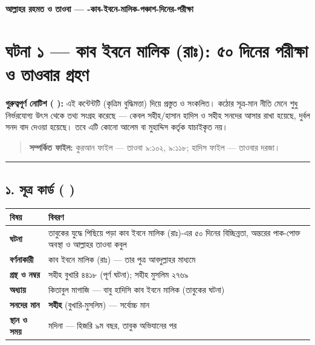 

\begin{center}{\Large\bfseries\color{emerald} আল্লাহর রহমত ও তাওবা — -কাব-ইবনে-মালিক-পঞ্চাশ-দিনের-পরীক্ষা}\end{center}
\vspace{1em}
\section*{ঘটনা ১ — কাব ইবনে মালিক (রাঃ): ৫০ দিনের পরীক্ষা ও তাওবার গ্রহণ}

\begin{warnbox}
 \textbf{গুরুত্বপূর্ণ নোটিশ ( ):} এই কন্টেন্টটি  (কৃত্রিম বুদ্ধিমত্তা) দিয়ে প্রস্তুত ও সংকলিত।  কঠোর সূত্র-মান নীতি মেনে শুধু নির্ভরযোগ্য উৎস থেকে তথ্য সংগ্রহ করেছে — কেবল সহীহ/হাসান হাদিস ও সহীহ সনদের আসার রাখা হয়েছে, দুর্বল সনদ বাদ দেওয়া হয়েছে। তবে এটি কোনো আলেম বা মুহাদ্দিস কর্তৃক যাচাইকৃত নয়।
\end{warnbox}

\begin{quote}
\textbf{সম্পর্কিত ফাইল:} কুরআন ফাইল — তাওবা ৯:১০২, ৯:১১৮; হাদিস ফাইল — তাওবার দরজা।
\end{quote}

\medskip\hrule\medskip

\subsection*{১. সূত্র কার্ড ( )}

\begin{table}[h]\centering\small
\begin{tabular}{ll}
বিষয় & বিবরণ \\
\hline
\textbf{ঘটনা} & তাবুকের যুদ্ধে পিছিয়ে পড়া কাব ইবনে মালিক (রাঃ)-এর ৫০ দিনের বিচ্ছিন্নতা, অন্তরের পাক-পোক্ত অবস্থা ও আল্লাহর তাওবা কবুল \\
\textbf{বর্ণনাকারী} & কাব ইবনে মালিক (রাঃ) — তার পুত্র আবদুল্লাহর মাধ্যমে \\
\textbf{গ্রন্থ ও নম্বর} & সহীহ বুখারি ৪৪১৮ (পূর্ণ ঘটনা); সহীহ মুসলিম ২৭৬৯ \\
\textbf{অধ্যায়} & কিতাবুল মাগাজি — বাবু হাদিসি কাব ইবনে মালিক (তাবুকের ঘটনা) \\
\textbf{সনদের মান} & \textbf{সহীহ} (বুখারি-মুসলিম) — সর্বোচ্চ মান \\
\textbf{স্থান ও সময়} & মদিনা — হিজরি ৯ম বছর, তাবুক অভিযানের পর \\
\hline
\end{tabular}
\end{table}


